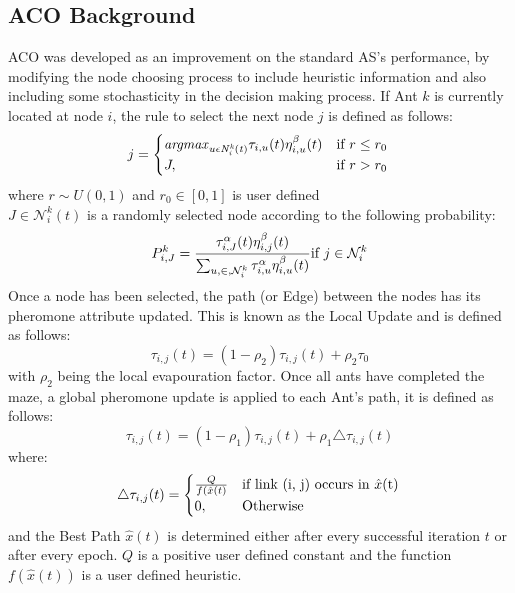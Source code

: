 \documentclass[conference]{IEEEtran}
\begin{document}
    \subsection{ACO Background}
        ACO was developed as an improvement on the standard AS's performance, by modifying the node choosing process to include heuristic information and also including some stochasticity in the decision making process. 
        If Ant $k$ is currently located at node $i$, the rule to select the next node $j$ is defined as follows:
        \begin{equation}
            j= 
              \begin{cases}
              \mathit{argmax}_{u\epsilon\mathit{N_{i}^{k}(t)}}\tau_{i,u}(t)\eta_{i,u}^{\beta}(t)   & \text{if } r \leq r_{0} \\
              J,             & \text{if } r > r_{0}
              \end{cases}\\
        \end{equation}
        where $r \sim U(0,1)$ and $r_0 \in [0,1]$ is user defined \\
        $J \in \mathcal{N}_i^k(t)$ is a randomly selected node according to the following probability:
        \begin{equation}
            P_{i,J}^k = \frac{
                \tau_{i,J}^\alpha(t)\eta_{i,j}^\beta(t) 
            }{
                \sum_{u,\in,\mathcal{N}_i^k}\tau_{i,u}^\alpha\eta_{i,u}^\beta(t)
            } \text{if } j \in \mathcal{N}_{i}^{k}\\
        \end{equation}
        Once a node has been selected, the path (or Edge) between the nodes has its pheromone attribute updated. This is known as the Local Update and is defined as follows:
        \begin{equation}
            \tau_{i,j}(t) = (1 - \rho_2)\tau_{i,j}(t) + \rho_2\tau_0 
        \end{equation}
        with $\rho_2$ being the local evapouration factor.
        Once all ants have completed the maze, a global pheromone update is applied to each Ant's path, it is defined as follows:
        \begin{equation}
            \tau_{i,j}(t) = (1 - \rho_1)\tau_{i,j}(t) + \rho_1\triangle\tau_{i,j}(t)
        \end{equation}
        where:
        \begin{equation}
            \triangle\tau_{i,j}(t) = 
            \begin{cases}
              \frac{Q}{f(\hat{x}(t)}  & \text{if link (i, j) occurs in $\hat{x}$(t)}  \\
              0,             & \text{Otherwise }
              \end{cases}\\
        \end{equation}
        and the Best Path $\hat{x}(t)$ is determined either after every successful iteration $t$ or after every epoch.
        $Q$ is a positive user defined constant and the function $f(\hat{x}(t))$ is a user defined heuristic.
        
\end{document}

